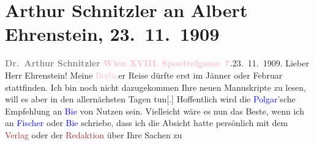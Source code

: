 

               \section[Arthur Schnitzler an Albert Ehrenstein, 23. 11. 1909]{ Arthur Schnitzler an Albert Ehrenstein, 23. 11. 1909}\nopagebreak{}\rehead{ }\normalsize\beginnumbering{} \toendnotes[C]{\smallbreak\pagebreak[2]} 
\toendnotes[C]{\smallbreak}\pstart
           \noindent{}{\pb}\textcolor{gray}{\textbf{Dr. Arthur Schnitzler}}\pend
           \pstart
           \textcolor{gray}{\textbf{\textcolor{pink}{Wien XVIII. Spoettelgasse 7}{}\ledrightnote{\textcolor{pink}{Edmund-Weiß-Gasse}}.}}\hfill 23. 11. 1909.\pend
           \pstart{}Lieber Herr Ehrenstein! \pend\pstart
           Meine \textcolor{pink}{Berlin}{}\ledrightnote{\textcolor{pink}{Berlin}}er Reise dürfte erst im
                        Jänner oder Februar stattfinden. Ich bin noch
                    nicht dazugekommen Ihre neuen Manuskripte zu lesen, will es aber in den
                    allernächsten Tagen tun{[}.{]} Hoffentlich
                     wird die
                        \textcolor{blue}{Polgar}{}\ledrightnote{\textcolor{blue}{Alfred Polgar}}’sche Empfehlung an \textcolor{blue}{Bie}{}\ledrightnote{\textcolor{blue}{Oskar Bie}} von Nutzen sein. Vielleicht wäre es nun das Beste,
                    wenn ich an \textcolor{blue}{Fischer}{}\ledrightnote{\textcolor{blue}{Samuel Fischer}} oder \textcolor{blue}{Bie}{}\ledrightnote{\textcolor{blue}{Oskar Bie}} schriebe, dass ich die Absicht hatte persönlich mit
                    dem \textcolor{brown}{Verlag}{} oder der \textcolor{brown}{Redaktion}{} über Ihre Sachen zu
